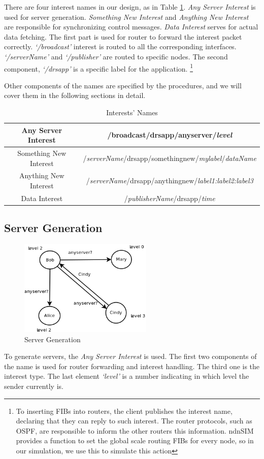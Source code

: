 \documentclass[conference]{IEEEtran}
\begin{document}
There are four interest names in our design, as in Table \ref{interest_name}.
\emph{Any Server Interest} is used for server generation.
\emph{Something New Interest} and \emph{Anything New Interest} are responsible for synchronizing control messages.
\emph{Data Interest} serves for actual data fetching.
The first part is used for router to forward the interest packet correctly.
\emph{`/broadcast'} interest is routed to all the corresponding interfaces.
\emph{`/serverName'} and \emph{`/publisher'} are routed to specific nodes.
The second component, \emph{`/drsapp'} is a specific label for the application.
\footnote{To inserting FIBs into routers, the client publishes the interest name,
declaring that they can reply to such interest.
The router protocols, such as OSPF\cite{OSPF}\cite{OSPFN},
are responsible to inform the other routers this information.
ndnSIM provides a function to set the global scale routing FIBs for every node,
so in our simulation, we use this to simulate this action}

Other components of the names are specified by the procedures,
and we will cover them in the following sections in detail.

\begin{table}[!t]
\renewcommand{\arraystretch}{1.3}
\caption{Interests' Names}
\label{interest_name}
\centering
\begin{tabular}{|c|c|}
\hline
Any Server Interest & /broadcast/drsapp/anyserver/\emph{level}\\
\hline
Something New Interest & /\emph{serverName}/drsapp/somethingnew/\emph{mylabel}/\emph{dataName}\\
\hline
Anything New Interest & /\emph{serverName}/drsapp/anythingnew/\emph{label1:label2:label3}\\
\hline
Data Interest & /\emph{publisherName}/drsapp/\emph{time}\\
\hline
\end{tabular}
\end{table}

\subsection{Server Generation}
\begin{figure}[!t]
\centering
\includegraphics[width=2.5in]{../png/server-generation.png}
\caption{Server Generation}
\label{server_generation}
\end{figure}
To generate servers, the \emph{Any Server Interest} is used.
The first two components of the name is used for router forwarding and interest handling.
The third one is the interest type.
The last element \emph{`level'} is a number indicating in which level the sender currently is.
\end{document}
